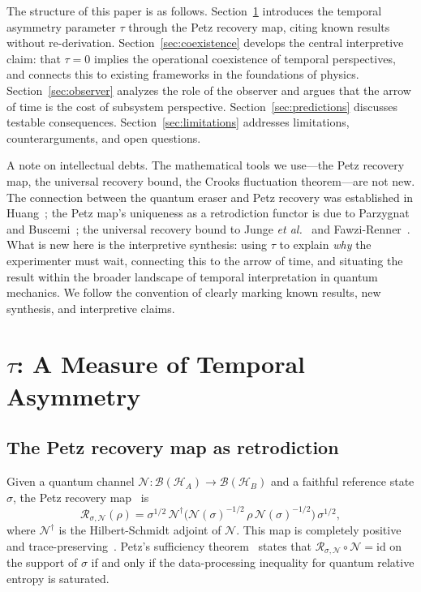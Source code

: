 \documentclass[12pt]{article}
\theoremstyle{definition}
\theoremstyle{remark}
\newcommand{\id}{\mathrm{id}}
\newcommand{\Petz}{\mathcal{R}}
\newcommand{\chan}{\mathcal{N}}
\newcommand{\hilb}{\mathcal{H}}
\newcommand{\tauasym}{\tau}
\begin{document}
The structure of this paper is as follows.
Section~\ref{sec:tau} introduces the temporal asymmetry parameter
$\tauasym$ through the Petz recovery map, citing known results without
re-derivation.
Section~\ref{sec:coexistence} develops the central interpretive
claim: that $\tauasym = 0$ implies the operational coexistence of
temporal perspectives, and connects this to existing frameworks in
the foundations of physics.
Section~\ref{sec:observer} analyzes the role of the observer and
argues that the arrow of time is the cost of subsystem perspective.
Section~\ref{sec:predictions} discusses testable consequences.
Section~\ref{sec:limitations} addresses limitations, counterarguments,
and open questions.

A note on intellectual debts.  The mathematical tools we use---the Petz
recovery map, the universal recovery bound, the Crooks fluctuation
theorem---are not new.  The connection between the quantum eraser and
Petz recovery was established in Huang~\cite{Huang2026}; the Petz
map's uniqueness as a retrodiction functor is due to Parzygnat and
Buscemi~\cite{Parzygnat2023}; the universal recovery bound to Junge
\emph{et al.}~\cite{Junge2018} and Fawzi-Renner~\cite{Fawzi2015}.
What is new here is the interpretive synthesis: using $\tauasym$ to
explain \emph{why} the experimenter must wait, connecting this to the
arrow of time, and situating the result within the broader landscape
of temporal interpretation in quantum mechanics.  We follow the
convention of clearly marking known results, new synthesis, and
interpretive claims.

\section{$\tauasym$: A Measure of Temporal Asymmetry}
\label{sec:tau}

\subsection{The Petz recovery map as retrodiction}

Given a quantum channel $\chan: \mathcal{B}(\hilb_A) \to
\mathcal{B}(\hilb_B)$ and a faithful reference state $\sigma$,
the Petz recovery map~\cite{Petz1986,Petz1988} is
\begin{equation}
\Petz_{\sigma,\chan}(\rho)
= \sigma^{1/2}\,\chan^\dagger\!\big(
\chan(\sigma)^{-1/2}\,\rho\,\chan(\sigma)^{-1/2}\big)
\,\sigma^{1/2},
\label{eq:petz}
\end{equation}
where $\chan^\dagger$ is the Hilbert-Schmidt adjoint of $\chan$.
This map is completely positive and trace-preserving~\cite{Petz1986}.
Petz's sufficiency theorem~\cite{Petz1988} states that
$\Petz_{\sigma,\chan} \circ \chan = \id$ on the support of
$\sigma$ if and only if the data-processing inequality for quantum
relative entropy is saturated.
\end{document}
